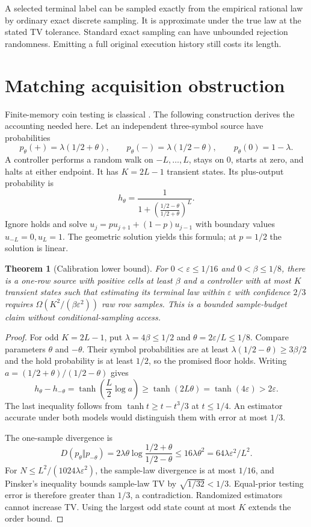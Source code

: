 \documentclass[11pt]{article}
\newtheorem{theorem}{Theorem}
\begin{document}
A selected terminal label can be sampled exactly from the empirical
rational law by ordinary exact discrete sampling. It is approximate
under the true law at the stated TV tolerance. Standard exact sampling
can have unbounded rejection randomness. Emitting a full original
execution history still costs its length.

\section{Matching acquisition obstruction}

Finite-memory coin testing is classical \cite{hellman,aaronson}.
The following construction derives the accounting needed here.
Let an independent three-symbol source have probabilities
\[
 p_\theta(+)=\lambda(1/2+\theta),\qquad
 p_\theta(-)=\lambda(1/2-\theta),\qquad
 p_\theta(0)=1-\lambda.
\]
A controller performs a random walk on $-L,\ldots,L$, stays on $0$,
starts at zero, and halts at either endpoint. It has $K=2L-1$ transient
states. Its plus-output probability is
\[
 h_\theta=\frac1{1+\left(\frac{1/2-\theta}{1/2+\theta}\right)^L}.
\]
Ignore holds and solve $u_j=p u_{j+1}+(1-p)u_{j-1}$ with boundary
values $u_{-L}=0,u_L=1$. The geometric solution yields this formula;
at $p=1/2$ the solution is linear.

\begin{theorem}[Calibration lower bound]
For $0<\varepsilon\le1/16$ and $0<\beta\le1/8$, there is a one-row
source with positive cells at least $\beta$ and a controller with at
most $K$ transient states such that estimating its terminal law within
$\varepsilon$ with confidence $2/3$ requires
$\Omega(K^2/(\beta\varepsilon^2))$ raw row samples.
This is a bounded sample-budget claim without conditional-sampling access.
\end{theorem}
\begin{proof}
For odd $K=2L-1$, put $\lambda=4\beta\le1/2$ and
$\theta=2\varepsilon/L\le1/8$. Compare parameters $\theta$ and $-\theta$.
Their symbol probabilities are at least
$\lambda(1/2-\theta)\ge3\beta/2$ and the hold probability is at least
$1/2$, so the promised floor holds. Writing
$a=(1/2+\theta)/(1/2-\theta)$ gives
\[
 h_\theta-h_{-\theta}
 =\tanh\left(\frac L2\log a\right)
 \ge\tanh(2L\theta)=\tanh(4\varepsilon)>2\varepsilon .
\]
The last inequality follows from $\tanh t\ge t-t^3/3$ at $t\le1/4$.
An estimator accurate under both models would distinguish them with
error at most $1/3$.

The one-sample divergence is
\[
 D(p_\theta\Vert p_{-\theta})
 =2\lambda\theta\log\frac{1/2+\theta}{1/2-\theta}
 \le16\lambda\theta^2=64\lambda\varepsilon^2/L^2.
\]
For $N\le L^2/(1024\lambda\varepsilon^2)$, the sample-law divergence is
at most $1/16$, and Pinsker's inequality bounds sample-law TV by
$\sqrt{1/32}<1/3$. Equal-prior testing error is therefore greater than
$1/3$, a contradiction. Randomized estimators cannot increase TV.
Using the largest odd state count at most $K$ extends the order bound.
\end{proof}
\end{document}
